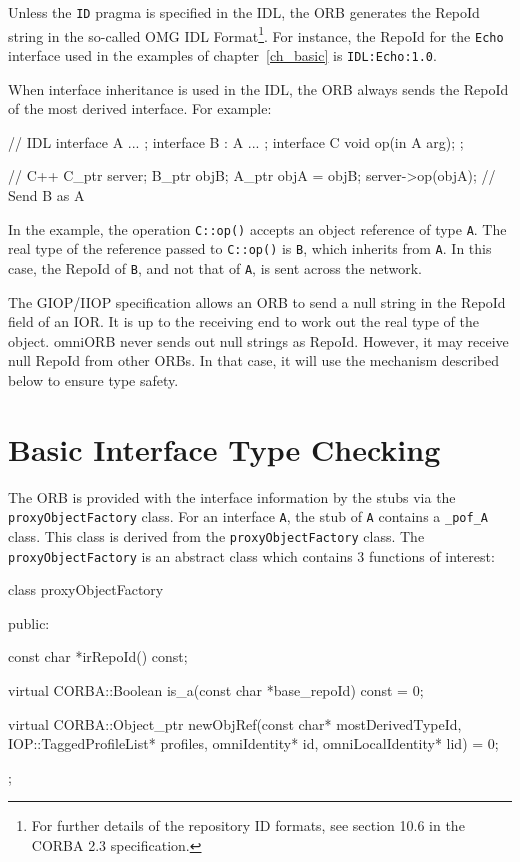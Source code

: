 \documentclass[11pt,twoside,a4paper]{book}
\newcommand{\type}[1]{\texttt{#1}}
\newcommand{\intf}[1]{\texttt{#1}}
\newcommand{\code}[1]{\texttt{#1}}
\newcommand{\op}[1]{\texttt{#1()}}
\begin{document}
Unless the \code{ID} pragma is specified in the IDL, the ORB generates
the RepoId string in the so-called OMG IDL Format\footnote{For further
details of the repository ID formats, see section 10.6 in the CORBA
2.3 specification.}. For instance, the RepoId for the \intf{Echo}
interface used in the examples of chapter~\ref{ch_basic} is
\texttt{IDL:Echo:1.0}.

When interface inheritance is used in the IDL, the ORB always sends the
RepoId of the most derived interface. For example:

\begin{idllisting}
   // IDL
   interface A {
     ...
   };
   interface B : A {
     ...
   };
   interface C {
      void op(in A arg);
   };
\end{idllisting}

\begin{cxxlisting}
   // C++
   C_ptr server;
   B_ptr objB;
   A_ptr objA = objB;
   server->op(objA);  // Send B as A
\end{cxxlisting}

In the example, the operation \op{C::op} accepts an object reference
of type \type{A}. The real type of the reference passed to \op{C::op}
is \type{B}, which inherits from \type{A}. In this case, the RepoId of
\type{B}, and not that of \type{A}, is sent across the network.

The GIOP/IIOP specification allows an ORB to send a null string in the
RepoId field of an IOR. It is up to the receiving end to work out the
real type of the object. omniORB never sends out null strings as
RepoId. However, it may receive null RepoId from other ORBs. In that
case, it will use the mechanism described below to ensure type safety.

\section{Basic Interface Type Checking}
\label{sec_intf}

The ORB is provided with the interface information by the stubs via
the \type{proxyObjectFactory} class. For an interface \intf{A}, the
stub of \intf{A} contains a \type{\_pof\_A} class. This class is
derived from the \type{proxyObjectFactory} class. The
\type{proxyObjectFactory} is an abstract class which contains 3
functions of interest:

\begin{cxxlisting}
class proxyObjectFactory {
public:

  const char *irRepoId() const;

  virtual CORBA::Boolean is_a(const char *base_repoId) const = 0;
       
  virtual CORBA::Object_ptr newObjRef(const char* mostDerivedTypeId,
                                      IOP::TaggedProfileList* profiles,
                                      omniIdentity* id,
                                      omniLocalIdentity* lid) = 0;
};
\end{cxxlisting}
\end{document}
